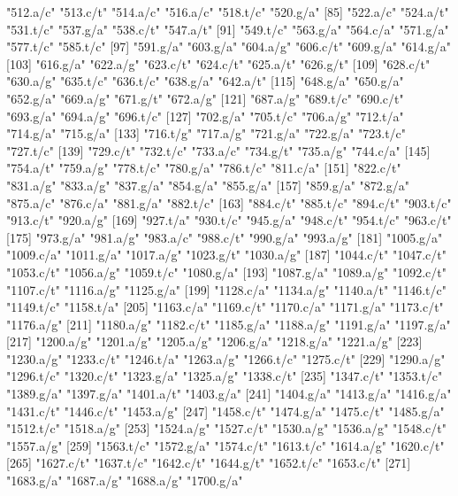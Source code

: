 \documentclass{article}
\begin{document}
\begin{Schunk}
\begin{Soutput}
 [79] "512.a/c"  "513.c/t"  "514.a/c"  "516.a/c"  "518.t/c"  "520.g/a" 
 [85] "522.a/c"  "524.a/t"  "531.t/c"  "537.g/a"  "538.c/t"  "547.a/t" 
 [91] "549.t/c"  "563.g/a"  "564.c/a"  "571.g/a"  "577.t/c"  "585.t/c" 
 [97] "591.g/a"  "603.g/a"  "604.a/g"  "606.c/t"  "609.g/a"  "614.g/a" 
[103] "616.g/a"  "622.a/g"  "623.c/t"  "624.c/t"  "625.a/t"  "626.g/t" 
[109] "628.c/t"  "630.a/g"  "635.t/c"  "636.t/c"  "638.g/a"  "642.a/t" 
[115] "648.g/a"  "650.g/a"  "652.g/a"  "669.a/g"  "671.g/t"  "672.a/g" 
[121] "687.a/g"  "689.t/c"  "690.c/t"  "693.g/a"  "694.a/g"  "696.t/c" 
[127] "702.g/a"  "705.t/c"  "706.a/g"  "712.t/a"  "714.g/a"  "715.g/a" 
[133] "716.t/g"  "717.a/g"  "721.g/a"  "722.g/a"  "723.t/c"  "727.t/c" 
[139] "729.c/t"  "732.t/c"  "733.a/c"  "734.g/t"  "735.a/g"  "744.c/a" 
[145] "754.a/t"  "759.a/g"  "778.t/c"  "780.g/a"  "786.t/c"  "811.c/a" 
[151] "822.c/t"  "831.a/g"  "833.a/g"  "837.g/a"  "854.g/a"  "855.g/a" 
[157] "859.g/a"  "872.g/a"  "875.a/c"  "876.c/a"  "881.g/a"  "882.t/c" 
[163] "884.c/t"  "885.t/c"  "894.c/t"  "903.t/c"  "913.c/t"  "920.a/g" 
[169] "927.t/a"  "930.t/c"  "945.g/a"  "948.c/t"  "954.t/c"  "963.c/t" 
[175] "973.g/a"  "981.a/g"  "983.a/c"  "988.c/t"  "990.g/a"  "993.a/g" 
[181] "1005.g/a" "1009.c/a" "1011.g/a" "1017.a/g" "1023.g/t" "1030.a/g"
[187] "1044.c/t" "1047.c/t" "1053.c/t" "1056.a/g" "1059.t/c" "1080.g/a"
[193] "1087.g/a" "1089.a/g" "1092.c/t" "1107.c/t" "1116.a/g" "1125.g/a"
[199] "1128.c/a" "1134.a/g" "1140.a/t" "1146.t/c" "1149.t/c" "1158.t/a"
[205] "1163.c/a" "1169.c/t" "1170.c/a" "1171.g/a" "1173.c/t" "1176.a/g"
[211] "1180.a/g" "1182.c/t" "1185.g/a" "1188.a/g" "1191.g/a" "1197.g/a"
[217] "1200.a/g" "1201.a/g" "1205.a/g" "1206.g/a" "1218.g/a" "1221.a/g"
[223] "1230.a/g" "1233.c/t" "1246.t/a" "1263.a/g" "1266.t/c" "1275.c/t"
[229] "1290.a/g" "1296.t/c" "1320.c/t" "1323.g/a" "1325.a/g" "1338.c/t"
[235] "1347.c/t" "1353.t/c" "1389.g/a" "1397.g/a" "1401.a/t" "1403.g/a"
[241] "1404.g/a" "1413.g/a" "1416.g/a" "1431.c/t" "1446.c/t" "1453.a/g"
[247] "1458.c/t" "1474.g/a" "1475.c/t" "1485.g/a" "1512.t/c" "1518.a/g"
[253] "1524.a/g" "1527.c/t" "1530.a/g" "1536.a/g" "1548.c/t" "1557.a/g"
[259] "1563.t/c" "1572.g/a" "1574.c/t" "1613.t/c" "1614.a/g" "1620.c/t"
[265] "1627.c/t" "1637.t/c" "1642.c/t" "1644.g/t" "1652.t/c" "1653.c/t"
[271] "1683.g/a" "1687.a/g" "1688.a/g" "1700.g/a"
\end{Soutput}
\end{Schunk}
\end{document}
